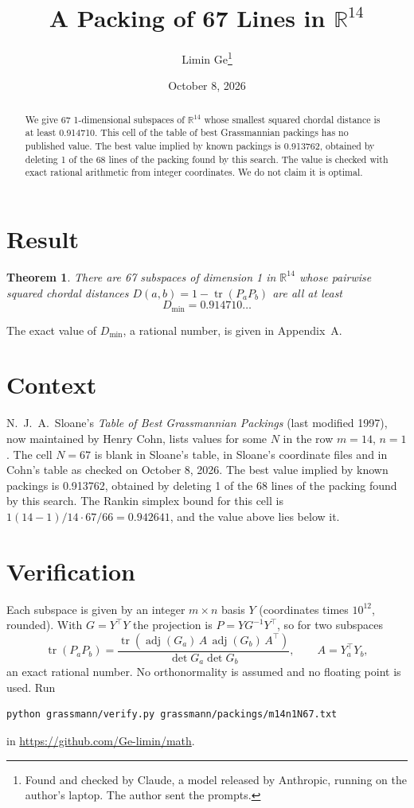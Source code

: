 \documentclass[11pt,a4paper]{article}
\title{A Packing of 67 Lines in $\mathbb{R}^{14}$}
\author{Limin Ge\thanks{Found and checked by Claude, a model released by Anthropic, running on the author's laptop. The author sent the prompts.}}
\date{October 8, 2026}
\newtheorem*{theorem}{Theorem}
\begin{document}
\maketitle
\begin{abstract}
We give 67 1-dimensional subspaces of $\mathbb{R}^{14}$ whose smallest squared chordal distance is at least 0.914710. This cell of the table of best Grassmannian packings has no published value. The best value implied by known packings is 0.913762, obtained by deleting 1 of the 68 lines of the packing found by this search. The value is checked with exact rational arithmetic from integer coordinates. We do not claim it is optimal.
\end{abstract}

\section{Result}
\begin{theorem}
There are 67 subspaces of dimension 1 in $\mathbb{R}^{14}$ whose pairwise squared chordal distances $D(a,b) = 1 - \operatorname{tr}(P_aP_b)$ are all at least
\[ D_{\min} = 0.914710\ldots \]
\end{theorem}
The exact value of $D_{\min}$, a rational number, is given in Appendix~A.


\section{Context}
N.~J.~A.~Sloane's \emph{Table of Best Grassmannian Packings} (last modified 1997), now maintained by Henry Cohn, lists values for some $N$ in the row $m=14$, $n=1$. The cell $N=67$ is blank in Sloane's table, in Sloane's coordinate files and in Cohn's table as checked on October 8, 2026. The best value implied by known packings is 0.913762, obtained by deleting 1 of the 68 lines of the packing found by this search. The Rankin simplex bound for this cell is $1(14-1)/14\cdot 67/66 = 0.942641$, and the value above lies below it.


\section{Verification}
Each subspace is given by an integer $m\times n$ basis $Y$ (coordinates times $10^{12}$, rounded). With $G=Y^\top Y$ the projection is $P=YG^{-1}Y^\top$, so for two subspaces
\[ \operatorname{tr}(P_aP_b)=\frac{\operatorname{tr}(\operatorname{adj}(G_a)\,A\,\operatorname{adj}(G_b)\,A^\top)}{\det G_a\det G_b},\qquad A=Y_a^\top Y_b, \]
an exact rational number. No orthonormality is assumed and no floating point is used. Run
\begin{verbatim}
python grassmann/verify.py grassmann/packings/m14n1N67.txt
\end{verbatim}
in \url{https://github.com/Ge-limin/math}.
\end{document}
